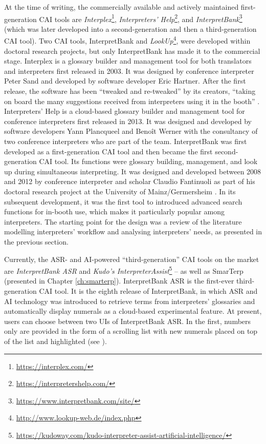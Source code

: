 At the time of writing, the commercially available and actively maintained first-generation CAI tools are \textit{Interplex}\footnote{\url{https://interplex.com/}}, \textit{Interpreters’ Help}\footnote{\url{https://interpretershelp.com/}}, and \textit{InterpretBank}\footnote{\url{https://www.interpretbank.com/site/}} (which was later developed into a second-generation and then a third-generation CAI tool). Two CAI tools, InterpretBank and \textit{LookUp}\footnote{\url{http://www.lookup-web.de/index.php}}, were developed within doctoral research projects, but only InterpretBank has made it to the commercial stage. Interplex is a glossary builder and management tool for both translators and interpreters first released in 2003. It was designed by conference interpreter Peter Sand and developed by software developer Eric Hartner. After the first release, the software has been ``tweaked and re-tweaked'' by its creators, ``taking on board the many suggestions received from interpreters using it in the booth'' \citep{sand2015}. Interpreters’ Help is a cloud-based glossary builder and management tool for conference interpreters first released in 2013. It was designed and developed by software developers Yann Plancqueel and Benoît Werner with the consultancy of two conference interpreters who are part of the team. InterpretBank was first developed as a first-generation CAI tool and then became the first second-generation CAI tool. Its functions were glossary building, management, and look up during simultaneous interpreting. It was designed and developed between 2008 and 2012 by conference interpreter and scholar Claudio Fantinuoli as part of his doctoral research project at the University of Mainz/Germersheim \citep{fantinuoli2016interpretbank}. In its subsequent development, it was the first tool to introduced advanced search functions for in-booth use, which makes it particularly popular among interpreters. The starting point for the design was a review of the literature modelling interpreters’ workflow and analysing interpreters’ needs, as presented in the previous section.

Currently, the ASR- and AI-powered “third-generation” CAI tools on the market are \textit{InterpretBank ASR} and \textit{Kudo’s InterpreterAssist}\footnote{\url{https://kudoway.com/kudo-interpreter-assist-artificial-intelligence/}}  -- as well as SmarTerp (presented in Chapter \ref{ch:smarterp}). InterpretBank ASR \citep{fantinuoli2017speech} is the first-ever third-generation CAI tool. It is the eighth release of InterpretBank, in which ASR and AI technology was introduced to retrieve terms from interpreters’ glossaries and automatically display numerals as a cloud-based experimental feature. At present, users can choose between two UIs of InterpretBank ASR. In the first, numbers only are provided in the form of a scrolling list with new numerals placed on top of the list and highlighted (see ).

